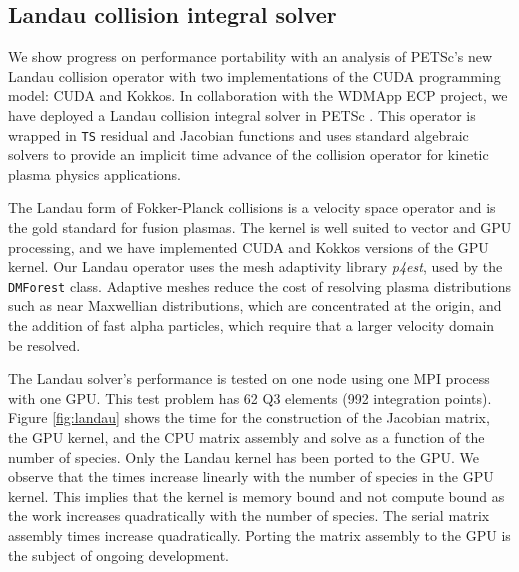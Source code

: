 \documentclass[10pt,journal,compsoc]{IEEEtran}
\begin{document}
\subsection{Landau collision integral solver}

We show progress on performance portability with an analysis of PETSc's new Landau collision operator with two implementations of the CUDA programming model: CUDA and Kokkos.
In collaboration with the WDMApp ECP project, we have deployed a Landau collision
integral solver in PETSc \cite{AdamsHirvijokiKnepleyBrownIsaacMills2017}. 
This operator is wrapped in {\tt TS} residual and Jacobian functions and uses standard algebraic solvers to provide an implicit time advance of the collision operator for kinetic plasma physics applications.

The Landau form of Fokker-Planck collisions is a velocity space
operator and is the gold standard for fusion plasmas. The kernel is well suited
to vector and GPU processing, and we have implemented CUDA and Kokkos versions of the GPU kernel.
Our Landau operator uses the mesh adaptivity library {\it p4est},
used by the {\tt DMForest} class. Adaptive meshes reduce the cost of
resolving plasma distributions such as near Maxwellian distributions, which are
concentrated at the origin, and the addition of fast alpha particles, which
require that a larger velocity domain be resolved.

The Landau solver's performance is tested  on one node using one MPI
process with one GPU. This test problem has 62 Q3 elements (992 integration
points). Figure \ref{fig:landau} shows the time for the construction of the
Jacobian matrix, the GPU kernel, and the CPU matrix assembly and solve as a
function of the number of species. Only the Landau
kernel has been ported to the GPU. We observe that the times increase linearly
with the number of species in the GPU kernel.
This implies that the kernel is memory bound and not compute bound as the work increases quadratically with the number of species.
The serial matrix assembly times increase quadratically. 
Porting the matrix assembly to the GPU is the subject of ongoing development.
\end{document}
